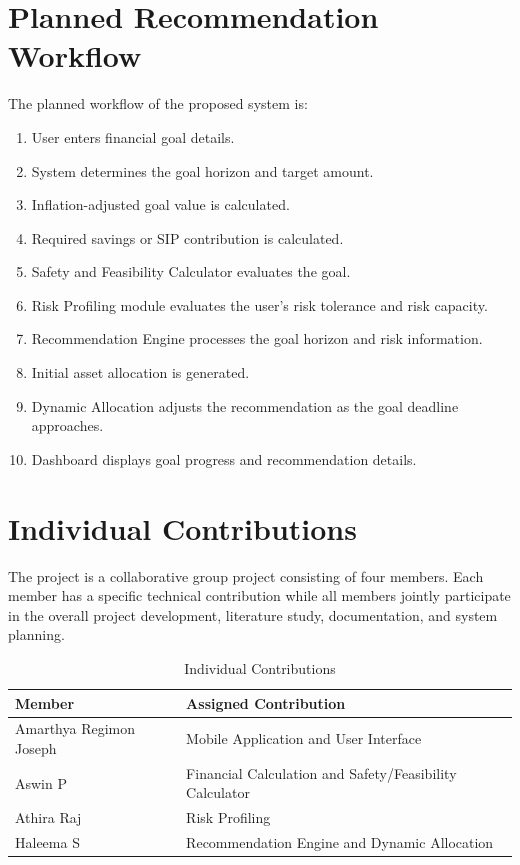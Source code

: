 \section{Planned Recommendation Workflow}
The planned workflow of the proposed system is:
\begin{enumerate}
	\item User enters financial goal details.
	\item System determines the goal horizon and target amount.
	\item Inflation-adjusted goal value is calculated.
	\item Required savings or SIP contribution is calculated.
	\item Safety and Feasibility Calculator evaluates the goal.
	\item Risk Profiling module evaluates the user's risk tolerance and risk capacity.
	\item Recommendation Engine processes the goal horizon and risk information.
	\item Initial asset allocation is generated.
	\item Dynamic Allocation adjusts the recommendation as the goal deadline approaches.
	\item Dashboard displays goal progress and recommendation details.
\end{enumerate}

\section{Individual Contributions}
The project is a collaborative group project consisting of four members. Each member has a specific technical contribution while all members jointly participate in the overall project development, literature study, documentation, and system planning.

\begin{table}[h!]
	\centering
	\caption{Individual Contributions}
	\label{tab:contrib}
	\vspace*{5pt}
	{\singlespacing\small
	\begin{tabular}{|p{4cm}|p{8cm}|}
		\hline
		\textbf{Member} & \textbf{Assigned Contribution} \\ \hline
		Amarthya Regimon Joseph & Mobile Application and User Interface \\ \hline
		Aswin P & Financial Calculation and Safety/Feasibility Calculator \\ \hline
		Athira Raj & Risk Profiling \\ \hline
		Haleema S & Recommendation Engine and Dynamic Allocation \\ \hline
	\end{tabular}}
\end{table}

